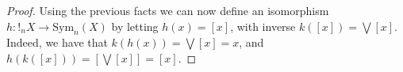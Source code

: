 \begin{proof}
Using the previous facts we can now define an isomorphism $h:!_{n}X\to  \mathrm{Sym}_{n}(X)$ by letting  $h(x)=[x]$, with inverse $k([x])=\bigvee [x]$. Indeed, we have that 
$k(h(x))=\bigvee[x]=x$, and 
$h(k([x]))=[\bigvee[x]]=[x]$.
%
%
%
%
%
%
%
%
%
\end{proof}


